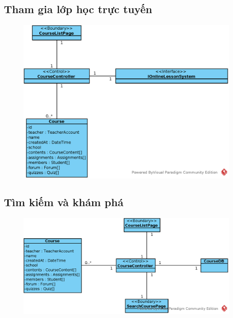 \documentclass[./../main_file.tex]{subfiles}
\begin{document}
\subsection{Tham gia lớp học trực tuyến}
\begin{figure}[H]
	\centering
	\includegraphics[width=\linewidth]{./images/define_attribute/ucd_atr_ss_join_online_class.eps}
\end{figure}
\subsection{Tìm kiếm và khám phá}
\begin{figure}[H]
	\centering
	\includegraphics[width=\linewidth]{./images/define_attribute/ucd_atr_search_course.eps}
\end{figure}
\end{document}
